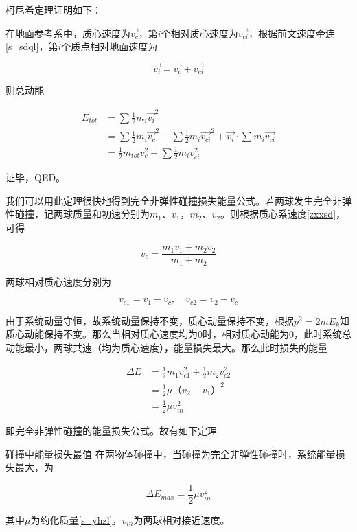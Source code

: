 柯尼希定理证明如下：

在地面参考系中，质心速度为$\vec{v_c}$，第$i$个相对质心速度为$\vec{v_{ci}}$，根据前文速度牵连\eqref{s_sdql}，第$i$个质点相对地面速度为

$$\vec{v_i} = \vec{v_c} + \vec{v_{ci}}$$

则总动能

\begin{subequations}
\begin{align*}
E_{tot} &= \sum \frac{1}{2} m_i \vec{v_i}^2 \\
&= \sum \frac{1}{2} m_i \vec{v_c}^2 + \sum \frac{1}{2} m_i \vec{v_{ci}}^2 + \vec{v_i} \cdot \sum m_i \vec{v_{ci}} \\
&= \frac{1}{2} m_{tot} v_c^2 + \sum \frac{1}{2} m_i v_{ci}^2
\end{align*}
\end{subequations}

证毕，QED。 

我们可以用此定理很快地得到完全非弹性碰撞损失能量公式。若两球发生完全非弹性碰撞，记两球质量和初速分别为$m_1$、$v_1$，$m_2$、$v_2$。则根据质心系速度\eqref{zxxsd}，可得

$$v_c = \frac{m_1 v_1 + m_2 v_2}{m_1+m_2}$$

两球相对质心速度分别为

$$v_{c1} = v_1 - v_c ,\quad v_{c2} = v_2 - v_c$$

由于系统动量守恒，故系统动量保持不变，质心动量保持不变，根据$p^2 = 2 m E_k$知质心动能保持不变。那么当相对质心速度均为$0$时，相对质心动能为$0$，此时系统总动能最小，两球共速（均为质心速度），能量损失最大。那么此时损失的能量

\begin{subequations}
\begin{align*}
\Delta E &= \frac{1}{2} m_1 v_{c1}^2 + \frac{1}{2} m_2 v_{c2}^2 \\
&= \frac{1}{2} \mu （v_2 - v_1）^2 \\
&= \frac{1}{2} \mu v_{in}^2
\end{align*}
\end{subequations}

即完全非弹性碰撞的能量损失公式。故有如下定理

\begin{theo}{碰撞中能量损失最值}{}
在两物体碰撞中，当碰撞为完全非弹性碰撞时，系统能量损失最大，为

$$\Delta E_{max} = \frac{1}{2} \mu v_{in}^2$$

其中$\mu$为约化质量\eqref{s_yhzl}，$v_{in}$为两球相对接近速度。
\end{theo}

